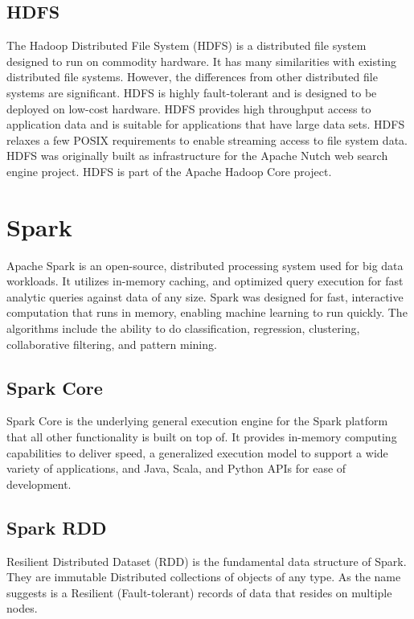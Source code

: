\subsection{HDFS}
The Hadoop Distributed File System (HDFS) is a distributed file system designed to run on
commodity hardware. It has many similarities with existing distributed file systems.
However, the differences from other distributed file systems are significant. HDFS is highly
fault-tolerant and is designed to be deployed on low-cost hardware. HDFS provides high
throughput access to application data and is suitable for applications that have large data sets.
HDFS relaxes a few POSIX requirements to enable streaming access to file system data.
HDFS was originally built as infrastructure for the Apache Nutch web search engine project.
HDFS is part of the Apache Hadoop Core project.\autocite{Borthakur2007a}

\section{Spark}
Apache Spark is an open-source, distributed processing system used for big data workloads. It utilizes in-memory caching, and optimized query execution for fast analytic queries against data of any size.
Spark was designed for fast, interactive computation that runs in memory, enabling machine learning to run quickly. The algorithms include the ability to do classification, regression, clustering, collaborative filtering, and pattern mining.\autocite{AwsAmazon2023a}

\subsection{Spark Core}
Spark Core is the underlying general execution engine for the Spark platform that all other functionality is built on top of. It provides in-memory computing capabilities to deliver speed, a generalized execution model to support a wide variety of applications, and Java, Scala, and Python APIs for ease of development.\autocite{databricks2023}

\subsection{Spark RDD}
Resilient Distributed Dataset (RDD) is the fundamental data structure of Spark. They are immutable Distributed collections of objects of any type. As the name suggests is a Resilient (Fault-tolerant) records of data that resides on multiple nodes.
